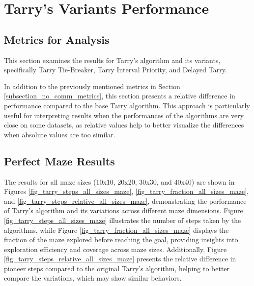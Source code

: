 \section{Tarry's Variants Performance}
\label{section_result_tarry}

\subsection{Metrics for Analysis}
\label{subsection_tarry_metrics}

This section examines the results for Tarry's algorithm and its variants, specifically Tarry Tie-Breaker, Tarry Interval Priority, and Delayed Tarry.

In addition to the previously mentioned metrics in Section \ref{subsection_no_comm_metrics}, this section presents a relative difference in performance compared to the base Tarry algorithm. This approach is particularly useful for interpreting results when the performances of the algorithms are very close on some datasets, as relative values help to better visualize the differences when absolute values are too similar.

\subsection{Perfect Maze Results} 
\label{subsection_tarry_maze_results}

The results for all maze sizes (10x10, 20x20, 30x30, and 40x40) are shown in Figures \ref{fig_tarry_steps_all_sizes_maze}, \ref{fig_tarry_fraction_all_sizes_maze}, and \ref{fig_tarry_steps_relative_all_sizes_maze}, demonstrating the performance of Tarry's algorithm and its variations across different maze dimensions. Figure \ref{fig_tarry_steps_all_sizes_maze} illustrates the number of steps taken by the algorithms, while Figure \ref{fig_tarry_fraction_all_sizes_maze} displays the fraction of the maze explored before reaching the goal, providing insights into exploration efficiency and coverage across maze sizes. Additionally, Figure \ref{fig_tarry_steps_relative_all_sizes_maze} presents the relative difference in pioneer steps compared to the original Tarry's algorithm, helping to better compare the variations, which may show similar behaviors.

